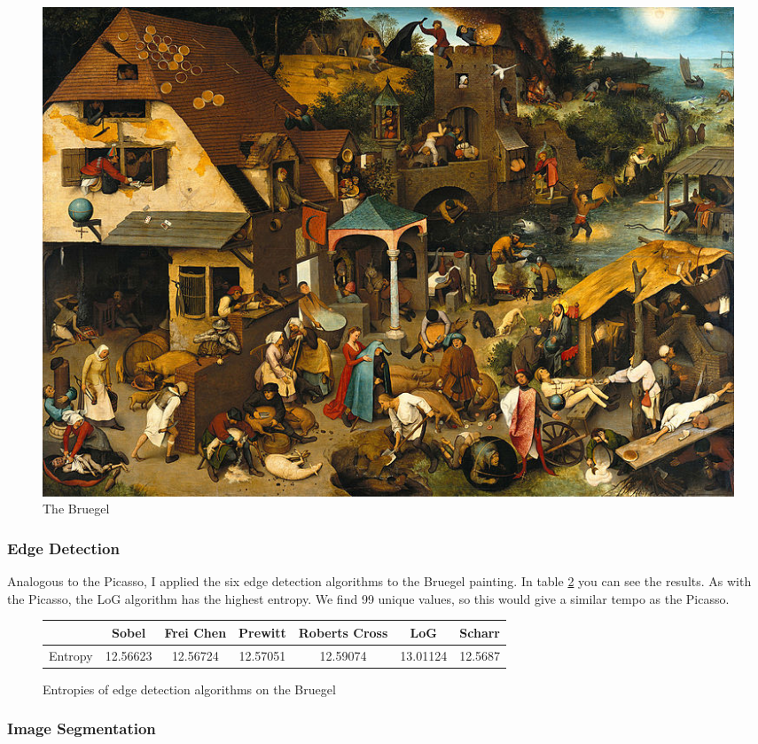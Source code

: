 \documentclass[12pt]{article}
\begin{document}
\begin{figure}[h]
\hspace*{-0.70cm}
\centering
\includegraphics[scale = 0.4]{img/bruegel}
\caption{The Bruegel}
\label{bruegel}
\end{figure} 

\subsubsection{Edge Detection}

Analogous to the Picasso, I applied the six edge detection algorithms to the Bruegel painting. In table \ref{bruegel_entropy} you can see the results. As with the Picasso, the LoG algorithm has the highest entropy. We find 99 unique values, so this would give a similar tempo as the Picasso.

\begin{figure}
\begin{tabular}{| c | c | c | c | c | c | c |}
\hline
& Sobel & Frei Chen & Prewitt & Roberts Cross & LoG & Scharr \\
\hline
Entropy & 12.56623 & 12.56724 & 12.57051 & 12.59074 & 13.01124 & 12.5687 \\ 
\hline
\end{tabular}
\caption{Entropies of edge detection algorithms on the Bruegel}
\label{bruegel_entropy}
\end{figure} 

\subsubsection{Image Segmentation}
\end{document}
